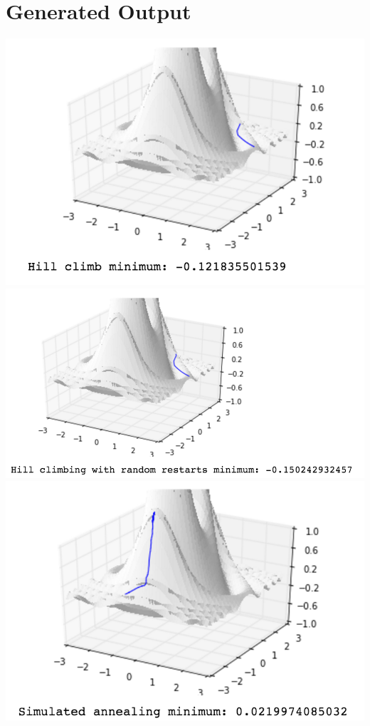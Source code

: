 \documentclass[a4paper]{article}
\begin{document}
\section{Generated Output}
\includegraphics[scale=0.5]{hill_climb}
\includegraphics[scale=0.5]{hill_climb_random_restart}
\includegraphics[scale=0.5]{simulated_annealing}
\end{document}
